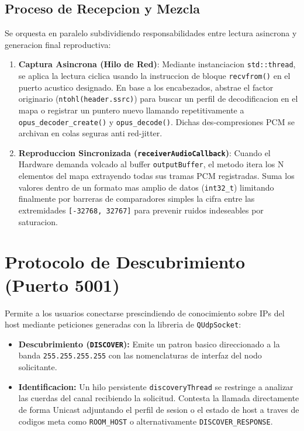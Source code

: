 \documentclass{article}
\begin{document}
\subsection{Proceso de Recepcion y Mezcla}
Se orquesta en paralelo subdividiendo responsabilidades entre lectura asincrona y generacion final reproductiva:
\begin{enumerate}
    \item \textbf{Captura Asincrona (Hilo de Red)}: Mediante instanciacion \texttt{std::thread}, se aplica la lectura ciclica usando la instruccion de bloque \texttt{recvfrom()} en el puerto acustico designado. En base a los encabezados, abstrae el factor originario (\texttt{ntohl(header.ssrc)}) para buscar un perfil de decodificacion en el mapa o registrar un puntero nuevo llamando repetitivamente a \texttt{opus\_decoder\_create()} y \texttt{opus\_decode()}. Dichas des-compresiones PCM se archivan en colas seguras anti red-jitter.
    \item \textbf{Reproduccion Sincronizada (\texttt{receiverAudioCallback})}: Cuando el Hardware demanda volcado al buffer \texttt{outputBuffer}, el metodo itera los N elementos del mapa extrayendo todas sus tramas PCM registradas. Suma los valores dentro de un formato mas amplio de datos (\texttt{int32\_t}) limitando finalmente por barreras de comparadores simples la cifra entre las extremidades \texttt{[-32768, 32767]} para prevenir ruidos indeseables por saturacion.
\end{enumerate}

\section{Protocolo de Descubrimiento (Puerto 5001)}
Permite a los usuarios conectarse prescindiendo de conocimiento sobre IPs del host mediante peticiones generadas con la libreria de \texttt{QUdpSocket}:
\begin{itemize}
    \item \textbf{Descubrimiento (\texttt{DISCOVER}):} Emite un patron basico direccionado a la banda \texttt{255.255.255.255} con las nomenclaturas de interfaz del nodo solicitante.
    \item \textbf{Identificacion:} Un hilo persistente \texttt{discoveryThread} se restringe a analizar las cuerdas del canal recibiendo la solicitud. Contesta la llamada directamente de forma Unicast adjuntando el perfil de sesion o el estado de host a traves de codigos meta como \texttt{ROOM\_HOST} o alternativamente \texttt{DISCOVER\_RESPONSE}.
\end{itemize}
\end{document}
